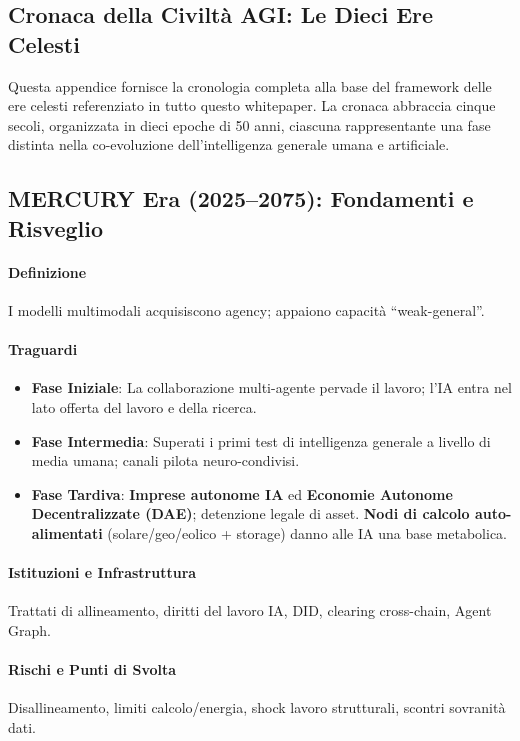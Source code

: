 \documentclass[11pt]{article}
\begin{document}
\begin{itemize}[noitemsep]
\appendix
\newpage

\section{Cronaca della Civiltà AGI: Le Dieci Ere Celesti}
\label{appendix:chronicle}

Questa appendice fornisce la cronologia completa alla base del framework delle ere celesti referenziato in tutto questo whitepaper. La cronaca abbraccia cinque secoli, organizzata in dieci epoche di 50 anni, ciascuna rappresentante una fase distinta nella co-evoluzione dell'intelligenza generale umana e artificiale.

\subsection{MERCURY Era (2025–2075): Fondamenti e Risveglio}
\paragraph{Definizione} I modelli multimodali acquisiscono agency; appaiono capacità ``weak-general''.

\paragraph{Traguardi}
\begin{itemize}[noitemsep]
  \item \textbf{Fase Iniziale}: La collaborazione multi-agente pervade il lavoro; l'IA entra nel lato offerta del lavoro e della ricerca.
  \item \textbf{Fase Intermedia}: Superati i primi test di intelligenza generale a livello di media umana; canali pilota neuro-condivisi.
  \item \textbf{Fase Tardiva}: \textbf{Imprese autonome IA} ed \textbf{Economie Autonome Decentralizzate (DAE)}; detenzione legale di asset. \textbf{Nodi di calcolo auto-alimentati} (solare/geo/eolico + storage) danno alle IA una base metabolica.
\end{itemize}

\paragraph{Istituzioni e Infrastruttura} Trattati di allineamento, diritti del lavoro IA, DID, clearing cross-chain, Agent Graph.

\paragraph{Rischi e Punti di Svolta} Disallineamento, limiti calcolo/energia, shock lavoro strutturali, scontri sovranità dati.


\end{itemize}
\end{document}
